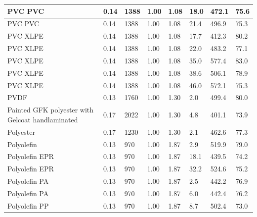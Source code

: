 \begin{table}[!h]
\begin{tabular}{|p{5.5cm}|p{1.0cm}|p{1.0cm}|p{0.8cm}|p{1.4cm}|p{1.0cm}|p{1.0cm}|p{1.2cm}|}
PVC PVC & 0.14 & 1388 & 1.00 & 1.08 & 18.0 & 472.1 & 75.6 \\ \hline
PVC PVC & 0.14 & 1388 & 1.00 & 1.08 & 21.4 & 496.9 & 75.3 \\ \hline
PVC XLPE & 0.14 & 1388 & 1.00 & 1.08 & 17.7 & 412.3 & 80.2 \\ \hline
PVC XLPE & 0.14 & 1388 & 1.00 & 1.08 & 22.0 & 483.2 & 77.1 \\ \hline
PVC XLPE & 0.14 & 1388 & 1.00 & 1.08 & 35.0 & 577.4 & 83.0 \\ \hline
PVC XLPE & 0.14 & 1388 & 1.00 & 1.08 & 38.6 & 506.1 & 78.9 \\ \hline
PVC XLPE & 0.14 & 1388 & 1.00 & 1.08 & 46.0 & 572.1 & 75.3 \\ \hline
PVDF & 0.13 & 1760 & 1.00 & 1.30 & 2.0 & 499.4 & 80.0 \\ \hline
Painted GFK polyester with Gelcoat handlaminated & 0.17 & 2022 & 1.00 & 1.30 & 4.8 & 401.1 & 73.9 \\ \hline
Polyester & 0.17 & 1230 & 1.00 & 1.30 & 2.1 & 462.6 & 77.3 \\ \hline
Polyolefin & 0.13 & 970 & 1.00 & 1.87 & 2.9 & 519.9 & 79.0 \\ \hline
Polyolefin EPR & 0.13 & 970 & 1.00 & 1.87 & 18.1 & 439.5 & 74.2 \\ \hline
Polyolefin EPR & 0.13 & 970 & 1.00 & 1.87 & 32.2 & 524.6 & 75.2 \\ \hline
Polyolefin PA & 0.13 & 970 & 1.00 & 1.87 & 2.5 & 442.2 & 76.9 \\ \hline
Polyolefin PA & 0.13 & 970 & 1.00 & 1.87 & 6.0 & 442.4 & 76.2 \\ \hline
Polyolefin PP & 0.13 & 970 & 1.00 & 1.87 & 8.7 & 502.4 & 73.0 \\ \hline
\end{tabular}
\label{Properties_RISE_Materials_polymers1}
\end{table}


